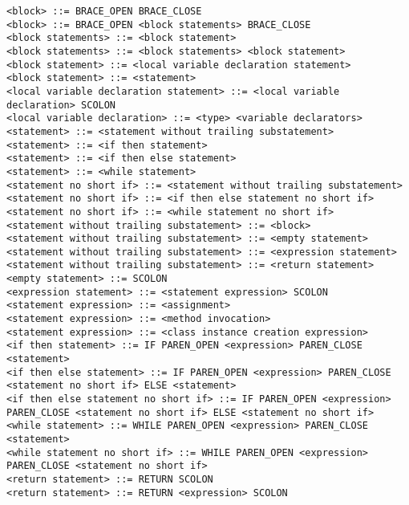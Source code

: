 \documentclass [a4paper,abstracton,titlepage]{scrartcl}
\begin{document}
\begin{lstlisting}
<block> ::= BRACE_OPEN BRACE_CLOSE
<block> ::= BRACE_OPEN <block statements> BRACE_CLOSE
<block statements> ::= <block statement>
<block statements> ::= <block statements> <block statement>
<block statement> ::= <local variable declaration statement>
<block statement> ::= <statement>
<local variable declaration statement> ::= <local variable declaration> SCOLON
<local variable declaration> ::= <type> <variable declarators>
<statement> ::= <statement without trailing substatement>
<statement> ::= <if then statement>
<statement> ::= <if then else statement>
<statement> ::= <while statement>
<statement no short if> ::= <statement without trailing substatement>
<statement no short if> ::= <if then else statement no short if>
<statement no short if> ::= <while statement no short if>
<statement without trailing substatement> ::= <block>
<statement without trailing substatement> ::= <empty statement>
<statement without trailing substatement> ::= <expression statement>
<statement without trailing substatement> ::= <return statement>
<empty statement> ::= SCOLON
<expression statement> ::= <statement expression> SCOLON
<statement expression> ::= <assignment>
<statement expression> ::= <method invocation>
<statement expression> ::= <class instance creation expression>
<if then statement> ::= IF PAREN_OPEN <expression> PAREN_CLOSE <statement>
<if then else statement> ::= IF PAREN_OPEN <expression> PAREN_CLOSE <statement no short if> ELSE <statement>
<if then else statement no short if> ::= IF PAREN_OPEN <expression> PAREN_CLOSE <statement no short if> ELSE <statement no short if>
<while statement> ::= WHILE PAREN_OPEN <expression> PAREN_CLOSE <statement>
<while statement no short if> ::= WHILE PAREN_OPEN <expression> PAREN_CLOSE <statement no short if>
<return statement> ::= RETURN SCOLON
<return statement> ::= RETURN <expression> SCOLON\end{lstlisting}
\end{document}

